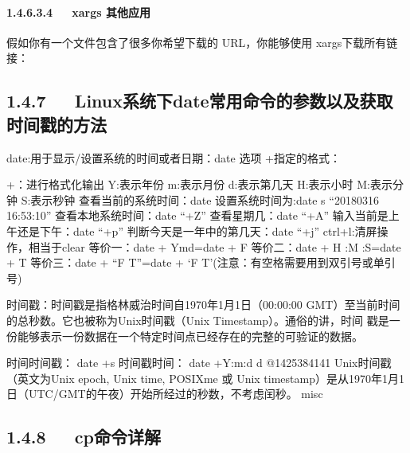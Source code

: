 \documentclass[letterpaper,12pt,english]{sphinxmanual}
\begin{document}
\paragraph{1.4.6.3.4   xargs 其他应用}
\label{\detokenize{001software/001install/linux:id25}}
假如你有一个文件包含了很多你希望下载的 URL，你能够使用
xargs下载所有链接：

\begin{sphinxVerbatim}[commandchars=\\\{\}]
\end{sphinxVerbatim}


\subsection{1.4.7   Linux系统下date常用命令的参数以及获取时间戳的方法}
\label{\detokenize{001software/001install/linux:linuxdate}}
date:用于显示/设置系统的时间或者日期：date 选项 +指定的格式：

\begin{sphinxVerbatim}[commandchars=\\\{\}]
+：进行格式化输出
\PYGZpc{}Y:表示年份
\PYGZpc{}m:表示月份
\PYGZpc{}d:表示第几天
\PYGZpc{}H:表示小时
\PYGZpc{}M:表示分钟
\PYGZpc{}S:表示秒钟
查看当前的系统时间：date
设置系统时间为:date \PYGZhy{}s “20180316 16:53:10”
查看本地系统时间：date “+\PYGZpc{}Z”
查看星期几：date “+\PYGZpc{}A”
输入当前是上午还是下午：date “+\PYGZpc{}p”
判断今天是一年中的第几天：date “+\PYGZpc{}j”
ctrl+l:清屏操作，相当于clear
等价一：date + \PYGZpc{}Y\PYGZhy{}\PYGZpc{}m\PYGZhy{}\PYGZpc{}d=date + \PYGZpc{}F
等价二：date + \PYGZpc{}H :\PYGZpc{}M :\PYGZpc{}S=date + \PYGZpc{}T
等价三：date + “\PYGZpc{}F \PYGZpc{}T”=date + ‘\PYGZpc{}F \PYGZpc{}T’(注意：有空格需要用到双引号或单引号)

时间戳：时间戳是指格林威治时间自1970年1月1日（00:00:00   GMT）至当前时间的总秒数。它也被称为Unix时间戳（Unix Timestamp）。通俗的讲，时间  戳是一份能够表示一份数据在一个特定时间点已经存在的完整的可验证的数据。

时间\PYGZhy{}\PYGZgt{}时间戳： date +\PYGZpc{}s
时间戳\PYGZhy{}\PYGZgt{}时间： date +\PYGZpc{}Y:\PYGZpc{}m:\PYGZpc{}d \PYGZhy{}d @1425384141
Unix时间戳（英文为Unix epoch, Unix time, POSIXme 或 Unix   timestamp）是从1970年1月1日（UTC/GMT的午夜）开始所经过的秒数，不考虑闰秒。
misc
\end{sphinxVerbatim}


\subsection{1.4.8   cp命令详解}
\label{\detokenize{001software/001install/linux:id26}}
\end{document}
